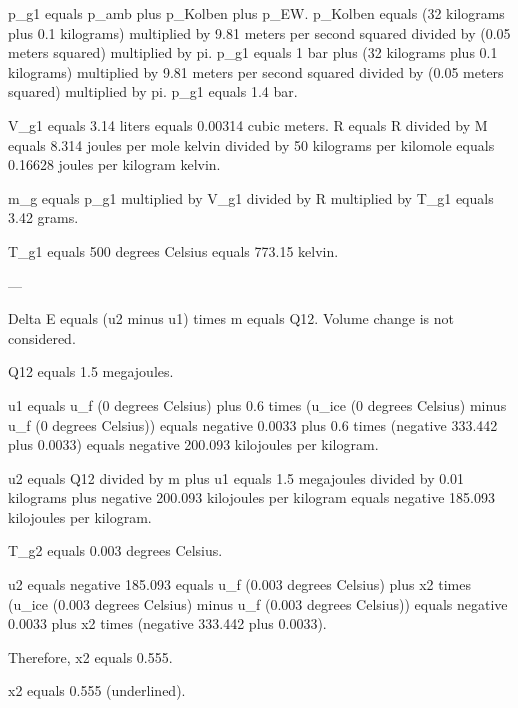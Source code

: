 p_g1 equals p_amb plus p_Kolben plus p_EW.  
p_Kolben equals (32 kilograms plus 0.1 kilograms) multiplied by 9.81 meters per second squared divided by (0.05 meters squared) multiplied by pi.  
p_g1 equals 1 bar plus (32 kilograms plus 0.1 kilograms) multiplied by 9.81 meters per second squared divided by (0.05 meters squared) multiplied by pi.  
p_g1 equals 1.4 bar.  

V_g1 equals 3.14 liters equals 0.00314 cubic meters.  
R equals R divided by M equals 8.314 joules per mole kelvin divided by 50 kilograms per kilomole equals 0.16628 joules per kilogram kelvin.  

m_g equals p_g1 multiplied by V_g1 divided by R multiplied by T_g1 equals 3.42 grams.  

T_g1 equals 500 degrees Celsius equals 773.15 kelvin.  

---

Delta E equals (u2 minus u1) times m equals Q12. Volume change is not considered.  

Q12 equals 1.5 megajoules.  

u1 equals u_f (0 degrees Celsius) plus 0.6 times (u_ice (0 degrees Celsius) minus u_f (0 degrees Celsius))  
equals negative 0.0033 plus 0.6 times (negative 333.442 plus 0.0033)  
equals negative 200.093 kilojoules per kilogram.  

u2 equals Q12 divided by m plus u1 equals 1.5 megajoules divided by 0.01 kilograms plus negative 200.093 kilojoules per kilogram  
equals negative 185.093 kilojoules per kilogram.  

T_g2 equals 0.003 degrees Celsius.  

u2 equals negative 185.093 equals u_f (0.003 degrees Celsius) plus x2 times (u_ice (0.003 degrees Celsius) minus u_f (0.003 degrees Celsius))  
equals negative 0.0033 plus x2 times (negative 333.442 plus 0.0033).  

Therefore, x2 equals 0.555.  

x2 equals 0.555 (underlined).